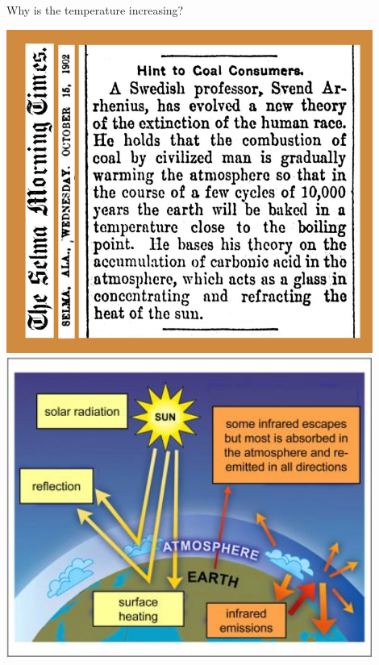 \documentclass[12pt]{beamer}
\begin{document}
\begin{frame}{Why is the temperature increasing?}

\begin{center}
\begin{minipage}{0.4\textwidth}
\vspace{0pt}
\includegraphics[width=0.9\textwidth]{images/svante-arrhenius_coal-and-warming_1902.jpg}\\
\includegraphics[width=0.9\textwidth]{images/greenhouse-effect_IPCC-2007}

\end{minipage}
\end{center}
\end{frame}
\end{document}
